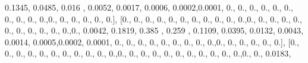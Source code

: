 \documentclass[
]{book}
\newenvironment{Shaded}{\begin{snugshade}}{\end{snugshade}}
\newcommand{\FloatTok}[1]{\textcolor[rgb]{0.00,0.00,0.81}{#1}}
\newcommand{\NormalTok}[1]{#1}
\begin{document}
\begin{Shaded}
\begin{Highlighting}[]
\FloatTok{0.1345}\NormalTok{, }\FloatTok{0.0485}\NormalTok{, }\FloatTok{0.016}\NormalTok{ , }\FloatTok{0.0052}\NormalTok{, }\FloatTok{0.0017}\NormalTok{, }\FloatTok{0.0006}\NormalTok{, }\FloatTok{0.0002}\NormalTok{,}\FloatTok{0.0001}\NormalTok{, }\FloatTok{0.}\NormalTok{, }\FloatTok{0.}\NormalTok{, }\FloatTok{0.}\NormalTok{, }\FloatTok{0.}\NormalTok{,}
\FloatTok{0.}\NormalTok{, }\FloatTok{0.}\NormalTok{, }\FloatTok{0.}\NormalTok{, }\FloatTok{0.}\NormalTok{, }\FloatTok{0.}\NormalTok{, }\FloatTok{0.}\NormalTok{,}\FloatTok{0.}\NormalTok{, }\FloatTok{0.}\NormalTok{, }\FloatTok{0.}\NormalTok{, }\FloatTok{0.}\NormalTok{, }\FloatTok{0.}\NormalTok{, }\FloatTok{0.}\NormalTok{], [}\FloatTok{0.}\NormalTok{, }\FloatTok{0.}\NormalTok{, }\FloatTok{0.}\NormalTok{, }\FloatTok{0.}\NormalTok{, }\FloatTok{0.}\NormalTok{, }\FloatTok{0.}\NormalTok{, }\FloatTok{0.}\NormalTok{, }\FloatTok{0.}\NormalTok{,}
\FloatTok{0.}\NormalTok{, }\FloatTok{0.}\NormalTok{, }\FloatTok{0.}\NormalTok{,}\FloatTok{0.}\NormalTok{, }\FloatTok{0.}\NormalTok{, }\FloatTok{0.}\NormalTok{, }\FloatTok{0.}\NormalTok{, }\FloatTok{0.}\NormalTok{, }\FloatTok{0.}\NormalTok{, }\FloatTok{0.}\NormalTok{, }\FloatTok{0.}\NormalTok{, }\FloatTok{0.}\NormalTok{, }\FloatTok{0.}\NormalTok{, }\FloatTok{0.}\NormalTok{,}\FloatTok{0.}\NormalTok{, }\FloatTok{0.0042}\NormalTok{, }\FloatTok{0.1819}\NormalTok{, }\FloatTok{0.385}
\NormalTok{, }\FloatTok{0.259}\NormalTok{ , }\FloatTok{0.1109}\NormalTok{, }\FloatTok{0.0395}\NormalTok{, }\FloatTok{0.0132}\NormalTok{, }\FloatTok{0.0043}\NormalTok{, }\FloatTok{0.0014}\NormalTok{, }\FloatTok{0.0005}\NormalTok{,}\FloatTok{0.0002}\NormalTok{, }\FloatTok{0.0001}\NormalTok{, }\FloatTok{0.}\NormalTok{, }\FloatTok{0.}\NormalTok{,}
\FloatTok{0.}\NormalTok{, }\FloatTok{0.}\NormalTok{, }\FloatTok{0.}\NormalTok{, }\FloatTok{0.}\NormalTok{, }\FloatTok{0.}\NormalTok{, }\FloatTok{0.}\NormalTok{, }\FloatTok{0.}\NormalTok{,}\FloatTok{0.}\NormalTok{, }\FloatTok{0.}\NormalTok{, }\FloatTok{0.}\NormalTok{, }\FloatTok{0.}\NormalTok{, }\FloatTok{0.}\NormalTok{, }\FloatTok{0.}\NormalTok{], [}\FloatTok{0.}\NormalTok{, }\FloatTok{0.}\NormalTok{, }\FloatTok{0.}\NormalTok{, }\FloatTok{0.}\NormalTok{, }\FloatTok{0.}\NormalTok{, }\FloatTok{0.}\NormalTok{, }\FloatTok{0.}\NormalTok{,}
\FloatTok{0.}\NormalTok{, }\FloatTok{0.}\NormalTok{, }\FloatTok{0.}\NormalTok{, }\FloatTok{0.}\NormalTok{,}\FloatTok{0.}\NormalTok{, }\FloatTok{0.}\NormalTok{, }\FloatTok{0.}\NormalTok{, }\FloatTok{0.}\NormalTok{, }\FloatTok{0.}\NormalTok{, }\FloatTok{0.}\NormalTok{, }\FloatTok{0.}\NormalTok{, }\FloatTok{0.}\NormalTok{, }\FloatTok{0.}\NormalTok{, }\FloatTok{0.}\NormalTok{, }\FloatTok{0.}\NormalTok{,}\FloatTok{0.}\NormalTok{, }\FloatTok{0.}\NormalTok{, }\FloatTok{0.0183}\NormalTok{,}

\end{Highlighting}
\end{Shaded}
\end{document}

